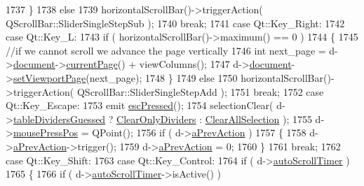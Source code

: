 \begin{DoxyCode}
1737             \}
1738             \textcolor{keywordflow}{else}
1739                 horizontalScrollBar()->triggerAction( QScrollBar::SliderSingleStepSub );
1740             \textcolor{keywordflow}{break};
1741         \textcolor{keywordflow}{case} Qt::Key\_Right:
1742         \textcolor{keywordflow}{case} Qt::Key\_L:
1743             \textcolor{keywordflow}{if} ( horizontalScrollBar()->maximum() == 0 )
1744             \{
1745                 \textcolor{comment}{//if we cannot scroll we advance the page vertically}
1746                 \textcolor{keywordtype}{int} next\_page = d->\hyperlink{classPageViewPrivate_a50645b9853306cffd74e51efb677e5b4}{document}->\hyperlink{classOkular_1_1Document_a42ec374d73794bf56d7e7b11f1f56319}{currentPage}() + viewColumns();
1747                 d->\hyperlink{classPageViewPrivate_a50645b9853306cffd74e51efb677e5b4}{document}->\hyperlink{classOkular_1_1Document_ac3bdbd5137c7fd4d5e960646affc25ec}{setViewportPage}(next\_page);
1748             \}
1749             \textcolor{keywordflow}{else}
1750                 horizontalScrollBar()->triggerAction( QScrollBar::SliderSingleStepAdd );
1751             \textcolor{keywordflow}{break};
1752         \textcolor{keywordflow}{case} Qt::Key\_Escape:
1753             emit \hyperlink{classPageView_abdd34f6d1c775b32ccc3e8bc9d0e3c29}{escPressed}();
1754             selectionClear( d->\hyperlink{classPageViewPrivate_a2ceb798d9b9f218e6acc3769d01102f4}{tableDividersGuessed} ? 
      \hyperlink{classPageView_a94ded93353c47276bfadb5ffc428a892af8bc77b79de50cd32e76617e7f471354}{ClearOnlyDividers} : \hyperlink{classPageView_a94ded93353c47276bfadb5ffc428a892acaa9219255254867e6ca9e31dff8fb8e}{ClearAllSelection} );
1755             d->\hyperlink{classPageViewPrivate_aa4799ae3aa24957d19a95220d8f61216}{mousePressPos} = QPoint();
1756             \textcolor{keywordflow}{if} ( d->\hyperlink{classPageViewPrivate_a63b5ccd8ed0f4ac9a89c040aeb3173a9}{aPrevAction} )
1757             \{
1758                 d->\hyperlink{classPageViewPrivate_a63b5ccd8ed0f4ac9a89c040aeb3173a9}{aPrevAction}->trigger();
1759                 d->\hyperlink{classPageViewPrivate_a63b5ccd8ed0f4ac9a89c040aeb3173a9}{aPrevAction} = 0;
1760             \}
1761             \textcolor{keywordflow}{break};
1762         \textcolor{keywordflow}{case} Qt::Key\_Shift:
1763         \textcolor{keywordflow}{case} Qt::Key\_Control:
1764             \textcolor{keywordflow}{if} ( d->\hyperlink{classPageViewPrivate_afe16a683945c2e7edf9906eb30ad6d8b}{autoScrollTimer} )
1765             \{
1766                 \textcolor{keywordflow}{if} ( d->\hyperlink{classPageViewPrivate_afe16a683945c2e7edf9906eb30ad6d8b}{autoScrollTimer}->isActive() )

\end{DoxyCode}
